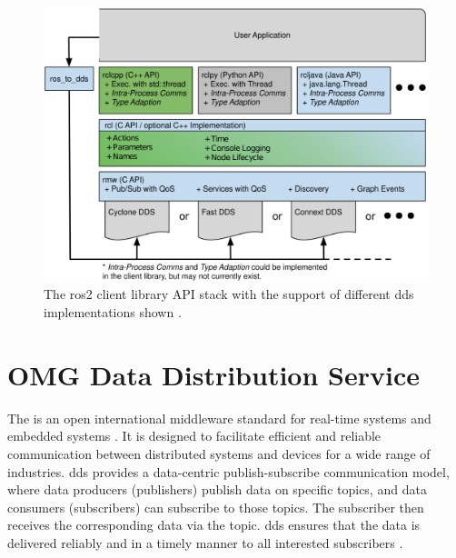 \begin{figure}[htbp]
	\centering
	\includegraphics[width=1\textwidth]{Figures/c3/ros2_client_library_stack.png}
	\caption{The \gls{ros2} client library API stack with the support of different \gls{dds} implementations shown \cite{macenski_robot_2022}.}
	\label{c3_fig_ros2_stack}
\end{figure}

\section{OMG Data Distribution Service}\label{c3_sec_dds}
The  is an open international middleware standard for real-time systems and embedded systems \cite{noauthor_data_nodate}. It is designed to facilitate efficient and reliable communication between distributed systems and devices for a wide range of industries.\newline 
\gls{dds} provides a data-centric publish-subscribe communication model, where data producers (publishers) publish data on specific topics, and data consumers (subscribers) can subscribe to those topics. The subscriber then receives the corresponding data via the topic. \gls{dds} ensures that the data is delivered reliably and in a timely manner to all interested subscribers \cite{pardo-castellote_omg_2003, schlesselman_omg_2004}.

